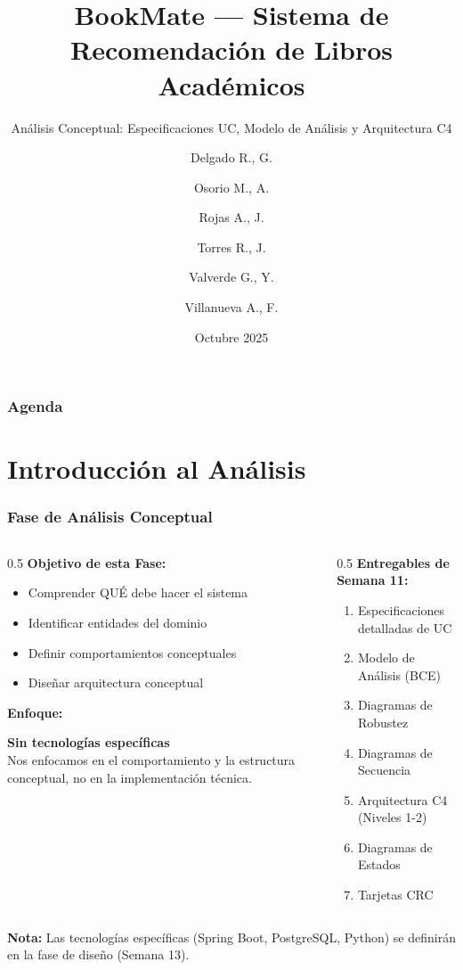 \documentclass[aspectratio=169]{beamer}
\title[BookMate]{BookMate — Sistema de Recomendación de Libros Académicos}
\subtitle{Análisis Conceptual: Especificaciones UC, Modelo de Análisis y Arquitectura C4}
\author[GRUPO 6]{Delgado R., G. \and Osorio M., A. \and Rojas A., J. \and Torres R., J. \and Valverde G., Y. \and Villanueva A., F.}
\institute[FC-UNI]{UNIVERSIDAD NACIONAL DE INGENIERÍA}
\date{Octubre 2025}
\begin{document}
\begin{frame}
\titlepage
\end{frame}

\begin{frame}
\frametitle{Agenda}
\tableofcontents
\end{frame}

\section{Introducción al Análisis}

\begin{frame}
\frametitle{Fase de Análisis Conceptual}

\begin{columns}
\begin{column}{0.5\textwidth}
\textbf{Objetivo de esta Fase:}
\begin{itemize}
\item Comprender QUÉ debe hacer el sistema
\item Identificar entidades del dominio
\item Definir comportamientos conceptuales
\item Diseñar arquitectura conceptual
\end{itemize}

\vspace{0.3cm}

\textbf{Enfoque:}
\begin{tcolorbox}[colback=blue!5, colframe=blue!50]
\textbf{Sin tecnologías específicas}\\
Nos enfocamos en el comportamiento y la estructura conceptual, no en la implementación técnica.
\end{tcolorbox}
\end{column}

\begin{column}{0.5\textwidth}
\textbf{Entregables de Semana 11:}
\begin{enumerate}
\item Especificaciones detalladas de UC
\item Modelo de Análisis (BCE)
\item Diagramas de Robustez
\item Diagramas de Secuencia
\item Arquitectura C4 (Niveles 1-2)
\item Diagramas de Estados
\item Tarjetas CRC
\end{enumerate}
\end{column}
\end{columns}

\vspace{0.3cm}

\begin{tcolorbox}[colback=yellow!5, colframe=yellow!50]
\textbf{Nota:} Las tecnologías específicas (Spring Boot, PostgreSQL, Python) se definirán en la fase de diseño (Semana 13).
\end{tcolorbox}

\end{frame}
\end{document}
